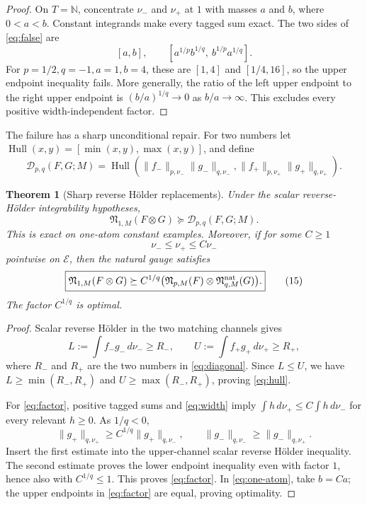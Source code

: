 \documentclass[10pt]{article}
\newtheorem{theorem}{Theorem}
\newcommand{\N}{\mathfrak N}
\newcommand{\Hull}{\operatorname{Hull}}
\begin{document}
\begin{proof}
On $T=\mathbb N$, concentrate $\nu_-$ and $\nu_+$ at $1$ with masses
$a$ and $b$, where $0<a<b$.  Constant integrands make every tagged sum exact.
The two sides of \eqref{eq:false} are
\[
 [a,b],\qquad
 [a^{1/p}b^{1/q},\ b^{1/p}a^{1/q}].
\tag{11}\label{eq:one-atom}
\]
For $p=1/2,q=-1,a=1,b=4$, these are $[1,4]$ and $[1/4,16]$, so the upper
endpoint inequality fails.  More generally, the ratio of the left upper
endpoint to the right upper endpoint is $(b/a)^{1/q}\to0$ as $b/a\to\infty$.
This excludes every positive width-independent factor.
\end{proof}

The failure has a sharp unconditional repair.  For two numbers let
$\Hull(x,y)=[\min(x,y),\max(x,y)]$, and define
\[
 \mathcal D_{p,q}(F,G;M)=\Hull\!\left(
 \|f_-\|_{p,\nu_-}\|g_-\|_{q,\nu_-},
 \|f_+\|_{p,\nu_+}\|g_+\|_{q,\nu_+}
 \right).
\tag{12}\label{eq:diagonal}
\]

\begin{theorem}[Sharp reverse Hölder replacements]\label{thm:reverse}
Under the scalar reverse-Hölder integrability hypotheses,
\[
 \boxed{\displaystyle
 \N_{1,M}(F\otimes G)\succeq\mathcal D_{p,q}(F,G;M).}
\tag{13}\label{eq:hull}
\]
This is exact on one-atom constant examples.  Moreover, if for some $C\ge1$
\[
                 \nu_-\le\nu_+\le C\nu_-
\tag{14}\label{eq:width}
\]
pointwise on $\mathcal E$, then the natural gauge satisfies
\[
 \boxed{\displaystyle
 \N_{1,M}(F\otimes G)\succeq
 C^{1/q}\bigl(\N_{p,M}(F)\otimes\N^{\rm nat}_{q,M}(G)\bigr).}
\tag{15}\label{eq:factor}
\]
The factor $C^{1/q}$ is optimal.
\end{theorem}

\begin{proof}
Scalar reverse Hölder in the two matching channels gives
\[
 L:=\int f_-g_-\,d\nu_-\ge R_-,\qquad
 U:=\int f_+g_+\,d\nu_+\ge R_+,
\]
where $R_-$ and $R_+$ are the two numbers in \eqref{eq:diagonal}.  Since
$L\le U$, we have $L\ge\min(R_-,R_+)$ and
$U\ge\max(R_-,R_+)$, proving \eqref{eq:hull}.

For \eqref{eq:factor}, positive tagged sums and \eqref{eq:width} imply
$\int h\,d\nu_+\le C\int h\,d\nu_-$ for every relevant $h\ge0$.  As
$1/q<0$,
\[
 \|g_+\|_{q,\nu_+}\ge C^{1/q}\|g_+\|_{q,\nu_-},
 \qquad
 \|g_-\|_{q,\nu_-}\ge\|g_-\|_{q,\nu_+}.
\]
Insert the first estimate into the upper-channel scalar reverse Hölder
inequality.  The second estimate proves the lower endpoint inequality even
with factor $1$, hence also with $C^{1/q}\le1$.  This proves
\eqref{eq:factor}.  In \eqref{eq:one-atom}, take $b=Ca$; the upper endpoints
in \eqref{eq:factor} are equal, proving optimality.
\end{proof}
\end{document}
